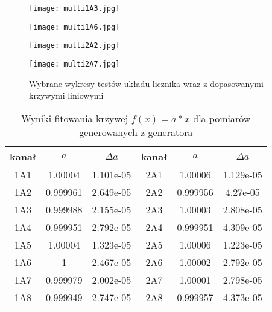 \begin{figure}
        \centering
        \begin{multicols}{2}
                \texttt{[image: multi1A3.jpg]} \par
                \texttt{[image: multi1A6.jpg]} \par                
        \end{multicols} \hfill
        \begin{multicols}{2}
                \texttt{[image: multi2A2.jpg]} \par
                \texttt{[image: multi2A7.jpg]} \par                
        \end{multicols}
        \caption{Wybrane wykresy testów układu licznika wraz z dopasowanymi krzywymi liniowymi}
        \label{multi wyk}
\end{figure}

\begin{table}
        \centering
        \caption{Wyniki fitowania krzywej $f(x) = a*x$ dla pomiarów generowanych z generatora}
        \label{multi fit}
        \begin{tabular}{|c|c|c||c|c|c|}
                \hline
                kanał & $a$ & $\Delta a$  &kanał & $a$ & $\Delta a$ \\ \hline
                1A1 & 1.00004 & 1.101e-05 & 2A1 &1.00006&1.129e-05 \\ \hline
                1A2 & 0.999961 &2.649e-05& 2A2 &0.999956&4.27e-05 \\ \hline
                1A3 & 0.999988&2.155e-05&2A3 & 1.00003&2.808e-05\\ \hline
                1A4 & 0.999951&2.792e-05&2A4&0.999951&4.309e-05\\ \hline
                1A5&1.00004&1.323e-05&2A5&1.00006&1.223e-05\\ \hline
                1A6&1&2.467e-05&2A6&1.00002&2.792e-05 \\ \hline
                1A7&0.999979&2.002e-05&2A7&1.00001&2.798e-05 \\ \hline
                1A8 &0.999949&2.747e-05&2A8&0.999957&4.373e-05 \\ \hline
        \end{tabular}
\end{table}

